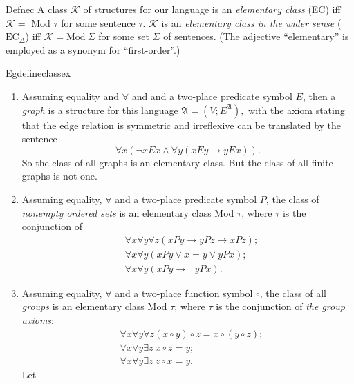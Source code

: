 \begin{reference}{Defn}{ec}
  A class $\mathcal{K}$ of structures for our language is an \textit{elementary class} (EC) iff $\mathcal{K}=\text{ Mod }\tau$ for some sentence $\tau$. $\mathcal{K}$ is an \textit{elementary class in the wider sense} ($\mathrm{EC}_{\Delta}$) iff $\mathcal{K}=\mathrm{Mod}\ \Sigma$ for some set $\Sigma$ of sentences. (The adjective “elementary” is employed as a synonym for “first-order”.)
\end{reference}

\begin{reference}{Eg}{defineclassex}
  \begin{enumerate}
    \item
          Assuming equality and $\forall$ and and a two-place predicate symbol $E$,  then a \textit{graph} is a structure for this language $\mathfrak{A}=(V;E^{\mathfrak{A}}),$ with the axiom stating that the edge relation is symmetric and irreflexive can be translated by the sentence
          \[ \forall x(\neg xEx\wedge\forall y(xEy\rightarrow yEx)). \] So the class of all graphs is an elementary class. But the class of all finite graphs is not one.
    \item Assuming equality, $\forall$ and a two-place predicate symbol $P$, the class of \textit{nonempty ordered sets} is an elementary class Mod $\tau$, where $\tau$ is the conjunction of
          \begin{align*}
             & \forall x\forall y\forall z(xPy\rightarrow yPz\rightarrow xPz); \\
             & \forall x\forall y(xPy\vee x=y\vee yPx);                        \\
             & \forall x\forall y(xPy\rightarrow\neg yPx).
          \end{align*}
    \item Assuming equality, $\forall$ and a two-place function symbol $\circ$, the class of all \textit{groups} is an elementary class Mod $\tau$, where $\tau$ is the conjunction of \textit{the group axioms}:
          \begin{align*}
             & \forall x\forall y\forall z(x\circ y)\circ z=x\circ(y\circ z); \\
             & \forall x\forall y\exists z\ x\circ z=y;                       \\
             & \forall x\forall y\exists z\ z\circ x=y.
          \end{align*}
          Let
          \begin{align*}

\end{align*}
\end{enumerate}
\end{reference}
